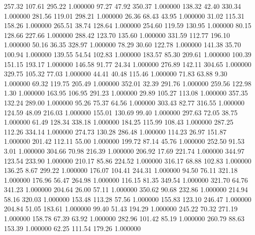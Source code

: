     257.32    107.61    295.22  1.000000
     97.27     47.92    350.37  1.000000
    138.32     42.40    330.34  1.000000
    281.56    119.01    298.21  1.000000
     26.36     68.43     43.95  1.000000
     31.02    115.31    158.26  1.000000
    265.51     38.74    128.64  1.000000
    254.60    119.59    130.95  1.000000
     80.15    128.66    227.66  1.000000
    288.42    123.70    135.60  1.000000
    331.59    112.77    196.10  1.000000
     50.16     36.35    328.97  1.000000
     78.29     30.60    122.78  1.000000
    141.38     35.70    100.94  1.000000
    139.55     54.54    102.83  1.000000
    183.57     85.30    209.61  1.000000
    100.39    151.15    193.17  1.000000
    146.58     91.77     24.34  1.000000
    276.89    142.11    304.65  1.000000
    329.75    105.32     77.03  1.000000
     44.41     40.48    115.46  1.000000
     71.83     63.88      9.30  1.000000
     69.32    119.75    205.49  1.000000
    352.01     32.39    291.76  1.000000
    259.56    122.98      1.30  1.000000
    163.95    106.95    291.23  1.000000
     29.89    105.27    113.08  1.000000
    357.35    132.24    289.00  1.000000
     95.26     75.37     64.56  1.000000
    303.43     82.77    316.55  1.000000
    124.59     48.09    216.03  1.000000
    155.01    130.69     99.40  1.000000
    297.63     72.05     38.75  1.000000
     61.49    128.34    338.18  1.000000
    184.25    115.99    108.43  1.000000
    287.25    112.26    334.14  1.000000
    274.73    130.28    286.48  1.000000
    114.23     26.97    151.87  1.000000
    201.42    112.11     55.00  1.000000
    199.72     87.14     45.76  1.000000
    252.50     91.53      3.01  1.000000
    304.66     70.98    216.39  1.000000
    206.92     17.69    221.74  1.000000
    344.97    123.54    233.90  1.000000
    210.17     85.86    224.52  1.000000
    316.17     68.88    102.83  1.000000
    136.25      8.67    299.22  1.000000
    176.07    104.41    244.31  1.000000
     94.50     76.11    321.18  1.000000
    176.96     56.47    264.98  1.000000
    116.15     81.35    349.54  1.000000
    321.70     64.76    341.23  1.000000
    204.64     26.00     57.11  1.000000
    350.62     90.68    232.86  1.000000
    214.94     58.16    320.03  1.000000
    153.48    113.28     57.56  1.000000
    155.83    123.10    246.47  1.000000
    204.84     51.05    183.61  1.000000
     99.40     51.43    194.29  1.000000
    245.22     70.32    271.19  1.000000
    158.78     67.39     63.92  1.000000
    282.96    101.42     85.19  1.000000
    260.79     88.63    153.39  1.000000
     62.25    111.54    179.26  1.000000
